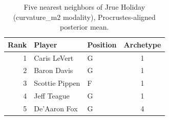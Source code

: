 \begin{table}[htbp]
  \centering\small
  \begin{tabular}{rllc}
    \toprule
    Rank & Player & Position & Archetype \\
    \midrule
    1 & Caris LeVert & G & 1 \\
    2 & Baron Davis & G & 1 \\
    3 & Scottie Pippen & F & 1 \\
    4 & Jeff Teague & G & 1 \\
    5 & De'Aaron Fox & G & 4 \\
    \bottomrule
  \end{tabular}
  \caption{Five nearest neighbors of Jrue Holiday (curvature_m2 modality), Procrustes-aligned posterior mean.}
  \label{tab:Jrue_Holiday_neighbors_curvature_m2}
\end{table}

